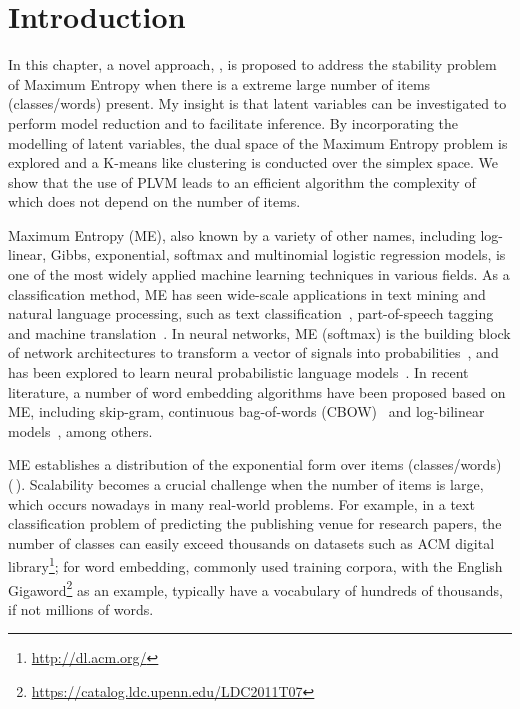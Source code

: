 \section{Introduction}

In this chapter, a novel approach, \DCME, is proposed to address the stability
problem of Maximum Entropy when there is a extreme large number of items
(classes/words) present. My insight is that latent variables can be investigated
to perform model reduction and to facilitate inference. By incorporating the
modelling of latent variables, the dual space of the Maximum Entropy problem is
explored and a K-means like clustering is conducted over the simplex space. We
show that the use of PLVM leads to an efficient algorithm the complexity of
which does not depend on the number of items.

Maximum Entropy (ME), also known by a variety of other names, including
log-linear, Gibbs, exponential, softmax and multinomial logistic regression
models, is one of the most widely applied machine learning techniques in various
fields. As a classification method, ME has seen wide-scale applications in text
mining and natural language processing, such as text
classification~\cite{nigam1999using}, part-of-speech
tagging~\cite{ratnaparkhi1996maximum} and machine
translation~\cite{berger1996maximum}. In neural networks, ME (softmax) is the
building block of network architectures to transform a vector of signals into
probabilities~\cite{collobert2008unified}, and has been explored to learn neural
probabilistic language models~\cite{bengio2003neural}. In recent literature, a
number of word embedding algorithms have been proposed based on ME, including
skip-gram, continuous bag-of-words
(CBOW)~\cite{mikolov2013efficient,mikolov2013distributed} and log-bilinear
models~\cite{mnih2007three}, among others.

ME establishes a distribution of the exponential form over items (classes/words)
(\,). Scalability becomes a crucial challenge when the number of
items is large, which occurs nowadays in many real-world problems.  For example,
in a text classification problem of predicting the publishing venue for research
papers, the number of classes can easily exceed thousands on datasets such as
ACM digital library\footnote{\url{http://dl.acm.org/}}; for word embedding,
commonly used training corpora, with the English
Gigaword\footnote{\url{https://catalog.ldc.upenn.edu/LDC2011T07}} as an example,
typically have a vocabulary of hundreds of thousands, if not millions of words.


